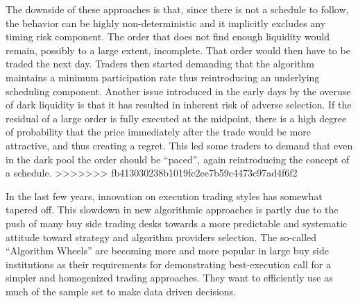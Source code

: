 The downside of these approaches is that, since there is not a schedule to follow, the behavior can be highly non-deterministic and it implicitly excludes any timing risk component. The order that does not find enough liquidity would remain, possibly to a large extent, incomplete. That order would then have to be traded the next day. Traders then started demanding that the algorithm maintains a minimum participation rate thus reintroducing an underlying scheduling component. Another issue introduced in the early days by the overuse of dark liquidity is that it has resulted in inherent risk of adverse selection. If the residual of a large order is fully executed at the midpoint, there is a high degree of probability that the price immediately after the trade would be more attractive, and thus creating a regret. This led some traders to demand that even in the dark pool the order should be ``paced'', again reintroducing the concept of a schedule.
>>>>>>> fb413030238b1019fc2ee7b59c4473c97ad4f6f2


In the last few years,  innovation on execution trading styles  has somewhat tapered off. This slowdown in new algorithmic approaches is partly due to the push of many buy side trading desks towards a more predictable and systematic attitude toward strategy and algorithm providers selection. The so-called ``Algorithm Wheels'' are becoming more and more popular in large buy side institutions as their requirements for demonstrating best-execution call for a simpler and homogenized trading approaches. They want to efficiently use as much of the sample set to make data driven decisions. 


